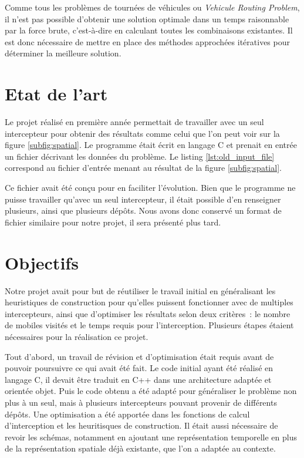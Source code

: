 		Comme tous les problèmes de tournées de véhicules ou \emph{Vehicule Routing Problem}, il n'est pas possible d'obtenir une solution optimale dans un temps raisonnable par la force brute, c'est-à-dire en calculant toutes les combinaisons existantes. Il est donc nécessaire de mettre en place des méthodes approchées itératives pour déterminer la meilleure solution.

	\section{Etat de l'art}

		Le projet réalisé en première année permettait de travailler avec un seul intercepteur pour obtenir des résultats comme celui que l'on peut voir sur la figure \ref{subfig:spatial}. Le programme était écrit en langage C et prenait en entrée un fichier décrivant les données du problème. Le listing \ref{lst:old_input_file} correspond au fichier d'entrée menant au résultat de la figure \ref{subfig:spatial}.

		Ce fichier avait été conçu pour en faciliter l'évolution. Bien que le programme ne puisse travailler qu'avec un seul intercepteur, il était possible d'en renseigner plusieurs, ainsi que plusieurs dépôts. Nous avons donc conservé un format de fichier similaire pour notre projet, il sera présenté plus tard.

		\begin{code}
			\label{lst:old_input_file}
		\end{code}

	\section{Objectifs}
		Notre projet avait pour but de réutiliser le travail initial en généralisant les heuristiques de construction pour qu'elles puissent fonctionner avec de multiples intercepteurs, ainsi que d'optimiser les résultats selon deux critères : le nombre de mobiles visités et le temps requis pour l'interception.
		Plusieurs étapes étaient nécessaires pour la réalisation ce projet.

		Tout d'abord, un travail de révision et d'optimisation était requis avant de pouvoir poursuivre ce qui avait été fait. Le code initial ayant été réalisé en langage C, il devait être traduit en C++ dans une architecture adaptée et orientée objet. Puis le code obtenu a été adapté pour généraliser le problème non plus à un seul, mais à plusieurs intercepteurs pouvant provenir de différents dépôts. Une optimisation a été apportée dans les fonctions de calcul d'interception et les heuritisques de construction. Il était aussi nécessaire de revoir les schémas, notamment en ajoutant une représentation temporelle en plus de la représentation spatiale déjà existante, que l'on a adaptée au contexte.

